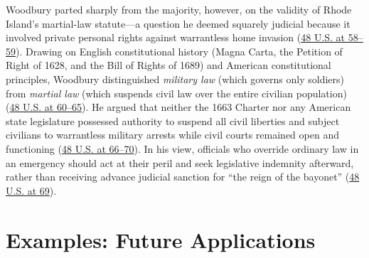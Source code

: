 \documentclass[12pt]{article}
\begin{document}
Woodbury parted sharply from the majority, however, on the validity of Rhode Island's martial-law statute---a question he deemed squarely judicial because it involved private personal rights against warrantless home invasion (\href{https://supreme.justia.com/cases/federal/us/48/1/}{48 U.S. at 58--59}). Drawing on English constitutional history (Magna Carta, the Petition of Right of 1628, and the Bill of Rights of 1689) and American constitutional principles, Woodbury distinguished \textit{military law} (which governs only soldiers) from \textit{martial law} (which suspends civil law over the entire civilian population) (\href{https://supreme.justia.com/cases/federal/us/48/1/}{48 U.S. at 60--65}). He argued that neither the 1663 Charter nor any American state legislature possessed authority to suspend all civil liberties and subject civilians to warrantless military arrests while civil courts remained open and functioning (\href{https://supreme.justia.com/cases/federal/us/48/1/}{48 U.S. at 66--70}). In his view, officials who override ordinary law in an emergency should act at their peril and seek legislative indemnity afterward, rather than receiving advance judicial sanction for ``the reign of the bayonet'' (\href{https://supreme.justia.com/cases/federal/us/48/1/}{48 U.S. at 69}).

\section{Examples: Future Applications}
\end{document}
